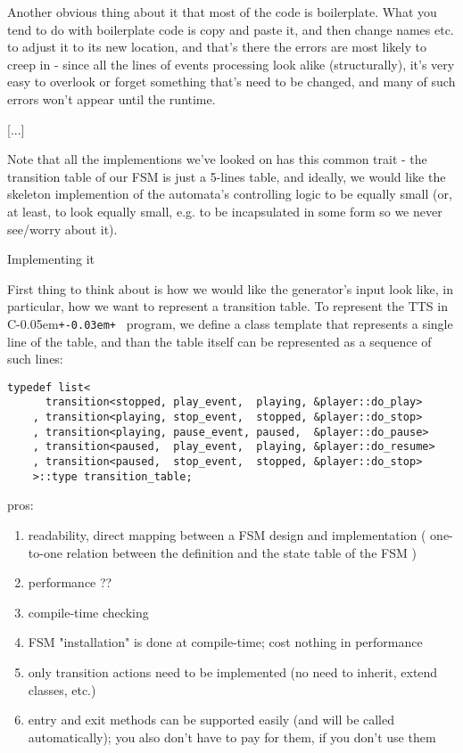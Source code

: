 \documentclass{netobjectdays}
\newcommand{\Cpp}{C\kern-0.05em\texttt{+\kern-0.03em+}%
}
\begin{document}
Another obvious thing about it that most of the code is 
boilerplate. What you tend to do with boilerplate code is copy 
and paste it, and then change names etc. to adjust it to its new 
location, and that's there the errors are most likely to creep in
- since all the lines of events processing look alike 
(structurally), it's very easy to overlook or forget something 
that's need to be changed, and many of such errors won't appear 
until the runtime.

[...]

Note that all the implementions we've looked on has this common 
trait - the transition table of our FSM is just a 5-lines table, 
and ideally, we would like the skeleton implemention of the 
automata's controlling logic to be equally small (or, at least, 
to look equally small, e.g. to be incapsulated in some form so 
we never see/worry about it). 

Implementing it

First thing to think about is how we would like the generator's 
input look like, in particular, how we want to represent a 
transition table. To represent the TTS in \Cpp\ program, we define 
a  class template that represents a single line 
of the table, and than the table itself can be represented as a 
sequence of such lines:

{\footnotesize
\begin{verbatim}
typedef list<
      transition<stopped, play_event,  playing, &player::do_play>
    , transition<playing, stop_event,  stopped, &player::do_stop>
    , transition<playing, pause_event, paused,  &player::do_pause>
    , transition<paused,  play_event,  playing, &player::do_resume>
    , transition<paused,  stop_event,  stopped, &player::do_stop>
    >::type transition_table;
\end{verbatim}
}

pros:
\begin{enumerate}
\item readability, direct mapping between a FSM design and 
    implementation ( one-to-one relation between the 
    definition and the state table of the FSM )
\item performance ??
\item compile-time checking 
\item FSM "installation" is done at compile-time; cost 
    nothing in performance 
\item only transition actions need to be implemented 
    (no need to inherit, extend classes, etc.) 
\item entry and exit methods can be supported easily 
    (and will be called automatically); you also don't have 
    to pay for them, if you don't use them 
\end{enumerate}
\end{document}
